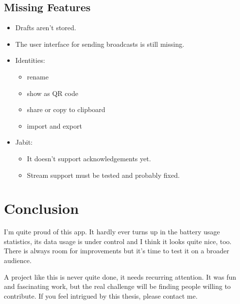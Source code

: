 \documentclass{bfh}
\begin{document}
  \subsection{Missing Features}
  \begin{itemize}
    \item Drafts aren't stored.
    \item The user interface for sending broadcasts is still missing.
    \item Identities:
      \begin{itemize}
        \item rename
        \item show as QR code
        \item share or copy to clipboard
        \item import and export
      \end{itemize}
    \item Jabit:
      \begin{itemize}
        \item It doesn't support acknowledgements yet.
        \item Stream support must be tested and probably fixed.
      \end{itemize}
  \end{itemize}



  \newpage
  \section{Conclusion}

  I'm quite proud of this app. It hardly ever turns up in the battery usage statistics, its data usage is under control and I think it looks quite nice, too. There is always room for improvements but it's time to test it on a broader audience.








  A project like this is never quite done, it needs recurring attention. It was fun and fascinating work, but the real challenge will be finding people willing to contribute. If you feel intrigued by this thesis, please contact me.













  \newpage
  
  
\end{document}

